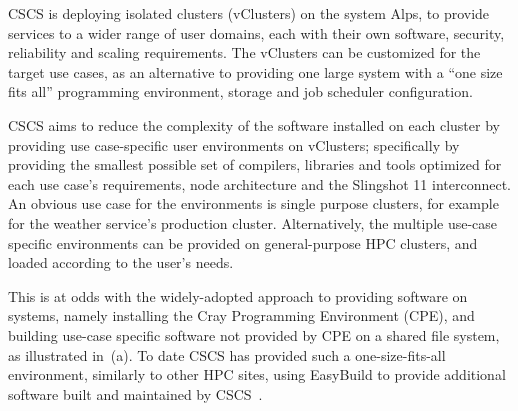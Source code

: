 CSCS is deploying isolated clusters (vClusters) on the \crayex system Alps, to provide services to a wider range of user domains, each with their own software, security, reliability and scaling requirements.
The vClusters can be customized for the target use cases, as an alternative to providing one large system with a ``one size fits all'' programming environment, storage and job scheduler configuration.

CSCS aims to reduce the complexity of the software installed on each cluster by providing use case-specific user environments on vClusters; specifically by providing the smallest possible set of compilers, libraries and tools optimized for each use case's requirements, node architecture and the Slingshot 11 interconnect.
An obvious use case for the environments is single purpose clusters, for example for the weather service's production cluster.
Alternatively, the multiple use-case specific environments can be provided on general-purpose HPC clusters, and loaded according to the user's needs.

This is at odds with the widely-adopted approach to providing software on \crayex systems, namely installing the Cray Programming Environment (CPE), and building use-case specific software not provided by CPE on a shared file system, as illustrated in~(a).
To date CSCS has provided such a one-size-fits-all environment, similarly to other HPC sites, using EasyBuild to provide additional software built and maintained by CSCS~\cite{forai:cug16}.


